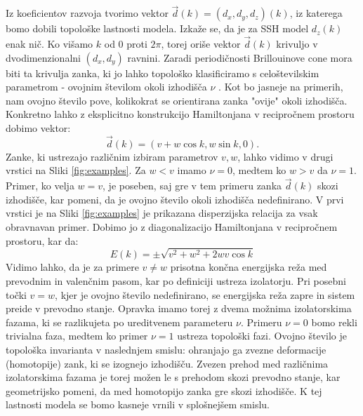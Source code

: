 Iz koeficientov razvoja tvorimo vektor $\vec{d}(k) = (d_x,d_y,d_z)(k)$, iz katerega bomo dobili topološke lastnosti modela. Izkaže se, da je za SSH model $d_z(k)$ enak nič. Ko višamo $k$ od $0$ proti $2 \pi$, torej oriše vektor $\vec{d}(k)$ krivuljo v dvodimenzionalni $(d_x,d_y)$ ravnini. Zaradi periodičnosti Brillouinove cone mora biti ta krivulja  zanka, ki jo lahko topološko klasificiramo s celoštevilskim parametrom - ovojnim številom okoli izhodišča $\nu$ \cite{hatcher}. Kot bo jasneje na primerih, nam ovojno število pove, kolikokrat se orientirana zanka "ovije"  okoli izhodišča.
Konkretno lahko z eksplicitno konstrukcijo Hamiltonjana v recipročnem prostoru dobimo vektor:
\begin{equation}
\vec{d}(k) = (v + w \cos k, w \sin k, 0).
\end{equation}
Zanke, ki ustrezajo različnim izbiram parametrov $v, w$, lahko vidimo v drugi vrstici na Sliki \ref{fig:examples}. Za $w < v$ imamo $\nu = 0$, medtem ko $w > v$ da $\nu=1$. Primer, ko velja $w=v$, je poseben, saj gre v tem primeru zanka $\vec{d}(k)$ skozi izhodišče, kar pomeni, da je ovojno število okoli izhodišča nedefinirano.
V prvi vrstici je na Sliki \ref{fig:examples} je prikazana disperzijska relacija za vsak obravnavan primer. Dobimo jo z diagonalizacijo Hamiltonjana v recipročnem prostoru, kar da:
\begin{equation}
E(k) = \pm \sqrt{v^2 + w^2 + 2 w v \cos k}
\end{equation}
Vidimo lahko, da je za primere $v \neq w$ prisotna končna energijska reža med prevodnim in valenčnim pasom, kar po definiciji ustreza izolatorju. Pri posebni točki $v=w$, kjer je ovojno število nedefinirano, se energijska reža zapre in sistem preide v prevodno stanje. Opravka imamo torej z dvema možnima izolatorskima fazama, ki se razlikujeta po ureditvenem parameteru $\nu$. Primeru $\nu=0$ bomo rekli trivialna faza, medtem ko primer $\nu=1$ ustreza topološki fazi. Ovojno število je topološka invarianta v naslednjem smislu: ohranjajo ga zvezne deformacije (homotopije) zank, ki se izognejo izhodišču. Zvezen prehod med različnima izolatorskima fazama je torej možen le s prehodom skozi prevodno stanje, kar geometrijsko pomeni, da med homotopijo zanka gre skozi izhodišče. K tej lastnosti modela se bomo kasneje vrnili v splošnejšem smislu.
